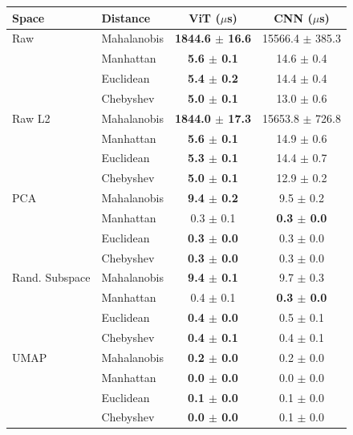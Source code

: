 \begin{tabular}{llcc}
\toprule
Space & Distance & ViT ($\mu$s) & CNN ($\mu$s) \\
\midrule
Raw & Mahalanobis & \textbf{1844.6 $\pm$ 16.6} & 15566.4 $\pm$ 385.3 \\
 & Manhattan & \textbf{5.6 $\pm$ 0.1} & 14.6 $\pm$ 0.4 \\
 & Euclidean & \textbf{5.4 $\pm$ 0.2} & 14.4 $\pm$ 0.4 \\
 & Chebyshev & \textbf{5.0 $\pm$ 0.1} & 13.0 $\pm$ 0.6 \\
\midrule
Raw L2 & Mahalanobis & \textbf{1844.0 $\pm$ 17.3} & 15653.8 $\pm$ 726.8 \\
 & Manhattan & \textbf{5.6 $\pm$ 0.1} & 14.9 $\pm$ 0.6 \\
 & Euclidean & \textbf{5.3 $\pm$ 0.1} & 14.4 $\pm$ 0.7 \\
 & Chebyshev & \textbf{5.0 $\pm$ 0.1} & 12.9 $\pm$ 0.2 \\
\midrule
PCA & Mahalanobis & \textbf{9.4 $\pm$ 0.2} & 9.5 $\pm$ 0.2 \\
 & Manhattan & 0.3 $\pm$ 0.1 & \textbf{0.3 $\pm$ 0.0} \\
 & Euclidean & \textbf{0.3 $\pm$ 0.0} & 0.3 $\pm$ 0.0 \\
 & Chebyshev & \textbf{0.3 $\pm$ 0.0} & 0.3 $\pm$ 0.0 \\
\midrule
Rand. Subspace & Mahalanobis & \textbf{9.4 $\pm$ 0.1} & 9.7 $\pm$ 0.3 \\
 & Manhattan & 0.4 $\pm$ 0.1 & \textbf{0.3 $\pm$ 0.0} \\
 & Euclidean & \textbf{0.4 $\pm$ 0.0} & 0.5 $\pm$ 0.1 \\
 & Chebyshev & \textbf{0.4 $\pm$ 0.1} & 0.4 $\pm$ 0.1 \\
\midrule
UMAP & Mahalanobis & \textbf{0.2 $\pm$ 0.0} & 0.2 $\pm$ 0.0 \\
 & Manhattan & \textbf{0.0 $\pm$ 0.0} & 0.0 $\pm$ 0.0 \\
 & Euclidean & \textbf{0.1 $\pm$ 0.0} & 0.1 $\pm$ 0.0 \\
 & Chebyshev & \textbf{0.0 $\pm$ 0.0} & 0.1 $\pm$ 0.0 \\

\bottomrule
\end{tabular}